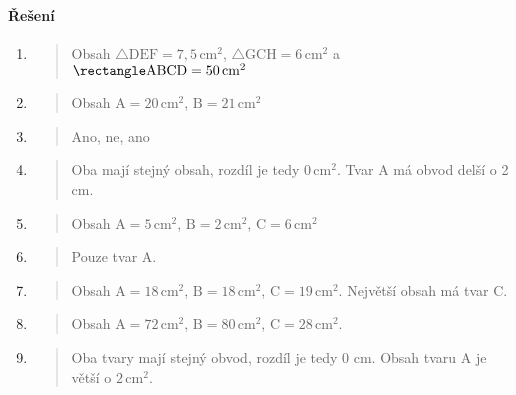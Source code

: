 \paragraph{Řešení}
\begin{enumerate}
    \item
    \begin{quote}
        Obsah $\triangle\text{DEF} = 7,5\,\text{cm}^2$, $\triangle\text{GCH} = 6\,\text{cm}^2$ a $\rectangle\text{ABCD} = 50\,\text{cm}^2$
    \end{quote}

    \item
    \begin{quote}
        Obsah $\text{A} = 20\,\text{cm}^2$, $\text{B} = 21\,\text{cm}^2$
    \end{quote}

    \item
    \begin{quote}
        Ano, ne, ano
    \end{quote}

    \item
    \begin{quote}
        Oba mají stejný obsah, rozdíl je tedy $0\,\text{cm}^2$.
        Tvar A má obvod delší o 2 cm.
    \end{quote}

    \item
    \begin{quote}
        Obsah $\text{A} = 5\,\text{cm}^2$, $\text{B} = 2\,\text{cm}^2$, $\text{C} = 6\,\text{cm}^2$
    \end{quote}

    \item
    \begin{quote}
        Pouze tvar A\@.
    \end{quote}

    \item
    \begin{quote}
        Obsah $\text{A} = 18\,\text{cm}^2$, $\text{B} = 18\,\text{cm}^2$, $\text{C} = 19\,\text{cm}^2$.
        Největší obsah má tvar C\@.
    \end{quote}

    \item
    \begin{quote}
        Obsah $\text{A} = 72\,\text{cm}^2$, $\text{B} = 80\,\text{cm}^2$, $\text{C} = 28\,\text{cm}^2$.
    \end{quote}

    \item
    \begin{quote}
        Oba tvary mají stejný obvod, rozdíl je tedy 0 cm.
        Obsah tvaru A je větší o $2\,\text{cm}^2$.
    \end{quote}


\end{enumerate}
